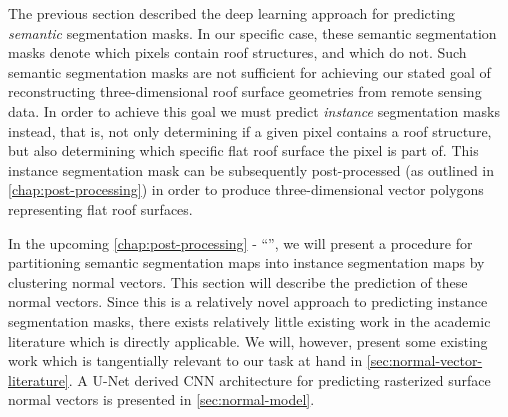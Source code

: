 The previous section described the deep learning approach for predicting \emph{semantic} segmentation masks.
In our specific case, these semantic segmentation masks denote which pixels contain roof structures, and which do not.
Such semantic segmentation masks are not sufficient for achieving our stated goal of reconstructing three-dimensional roof surface geometries from remote sensing data.
In order to achieve this goal we must predict \emph{instance} segmentation masks instead, that is, not only determining if a given pixel contains a roof structure, but also determining which specific flat roof surface the pixel is part of.
This instance segmentation mask can be subsequently post-processed (as outlined in \cref{chap:post-processing}) in order to produce three-dimensional vector polygons representing flat roof surfaces.

In the upcoming \cref{chap:post-processing} - \enquote{}, we will present a procedure for partitioning semantic segmentation maps into instance segmentation maps by clustering normal vectors.
This section will describe the prediction of these normal vectors.
Since this is a relatively novel approach to predicting instance segmentation masks, there exists relatively little existing work in the academic literature which is directly applicable.
We will, however, present some existing work which is tangentially relevant to our task at hand in \cref{sec:normal-vector-literature}.
A U-Net derived CNN architecture for predicting rasterized surface normal vectors is presented in \cref{sec:normal-model}.
